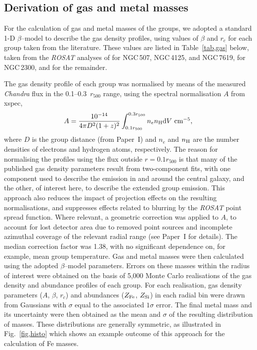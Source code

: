 \documentclass[useAMS,usenatbib]{mn2e}
\begin{document}
\subsection{Derivation of gas and metal masses}\label{sec,mgas}

For the calculation of gas and metal masses of the groups, we adopted
a standard 1-D $\beta$--model to describe the gas density profiles,
using values of $\beta$ and $r_c$ for each group taken from the
literature. These values are listed in Table~\ref{tab,gas} below,
taken from the {\em ROSAT} analyses of \citet{mulc03} for NGC\,507,
NGC\,4125, and NGC\,7619, \citet{davi96} for NGC\,2300, and
\citet{osmo04} for the remainder.

The gas density profile of each group was normalised by means of the
measured {\em Chandra} flux in the 0.1--0.3~$r_{500}$ range, using the
spectral normalisation $A$ from {\sc xspec},
\begin{equation}
  A = \frac{10^{-14}}{4\pi D^2 (1+z)^2} 
  \int_{0.1r_{500}}^{0.3r_{500}}n_en_{\rm H} \mbox{d}V  \mbox{ cm$^{-5}$}, 
\label{eq,xspec}
\end{equation} 
where $D$ is the group distance (from Paper~I) and $n_e$ and $n_{\rm
H}$ are the number densities of electrons and hydrogen atoms,
respectively. The reason for normalising the profiles using the flux
outside $r=0.1r_{500}$ is that many of the published gas density
parameters result from two-component fits, with one component used to
describe the emission in and around the central galaxy, and the other,
of interest here, to describe the extended group emission. This
approach also reduces the impact of projection effects on the
resulting normalisations, and suppresses effects related to blurring
by the {\em ROSAT} point spread function. Where relevant, a geometric
correction was applied to $A$, to account for lost detector area due
to removed point sources and incomplete azimuthal coverage of the
relevant radial range (see Paper~I for details). The median correction
factor was 1.38, with no significant dependence on, for example, mean
group temperature. Gas and metal masses were then calculated using the
adopted $\beta$--model parameters. Errors on these masses within the
radius of interest were obtained on the basis of 5,000 Monte Carlo
realisations of the gas density and abundance profiles of each
group. For each realisation, gas density parameters ($A$, $\beta$,
$r_c$) and abundances ($Z_{\rm Fe}$, $Z_{\rm Si}$) in each radial bin
were drawn from Gaussians with $\sigma$ equal to the associated
$1\sigma$ error.  The final metal mass and its uncertainty were then
obtained as the mean and $\sigma$ of the resulting distribution of
masses. These distributions are generally symmetric, as illustrated in
Fig.~\ref{fig,histo} which shows an example outcome of this approach
for the calculation of Fe masses.
\end{document}
